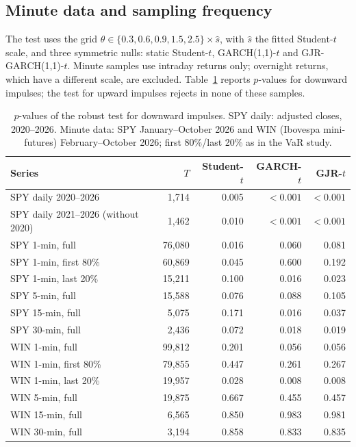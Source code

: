 \documentclass[11pt,a4paper]{article}
\theoremstyle{definition}
\theoremstyle{remark}
\begin{document}
\subsection{Minute data and sampling frequency}\label{sec:minute}
The test uses the grid $\theta\in\{0.3,0.6,0.9,1.5,2.5\}\times\hat s$, with $\hat s$ the fitted Student-$t$ scale, and three symmetric nulls: static Student-$t$, GARCH(1,1)-$t$ and GJR-GARCH(1,1)-$t$. Minute samples use intraday returns only; overnight returns, which have a different scale, are excluded. Table~\ref{tab:data} reports $p$-values for downward impulses; the test for upward impulses rejects in none of these samples.

\begin{table}[ht]\centering\footnotesize\setlength{\tabcolsep}{4pt}
\caption{$p$-values of the robust test for downward impulses. SPY daily: adjusted closes, 2020--2026. Minute data: SPY January--October 2026 and WIN (Ibovespa mini-futures) February--October 2026; first 80\%/last 20\% as in the VaR study.}\label{tab:data}
\begin{tabular}{lrrrr}
\toprule
Series & $T$ & Student-$t$ & GARCH-$t$ & GJR-$t$\\
\midrule
SPY daily 2020--2026 & 1{,}714 & 0.005 & $<0.001$ & $<0.001$\\
SPY daily 2021--2026 (without 2020) & 1{,}462 & 0.010 & $<0.001$ & $<0.001$\\
\addlinespace
SPY 1-min, full & 76{,}080 & 0.016 & 0.060 & 0.081\\
SPY 1-min, first 80\% & 60{,}869 & 0.045 & 0.600 & 0.192\\
SPY 1-min, last 20\% & 15{,}211 & 0.100 & 0.016 & 0.023\\
SPY 5-min, full & 15{,}588 & 0.076 & 0.088 & 0.105\\
SPY 15-min, full & 5{,}075 & 0.171 & 0.016 & 0.037\\
SPY 30-min, full & 2{,}436 & 0.072 & 0.018 & 0.019\\
\addlinespace
WIN 1-min, full & 99{,}812 & 0.201 & 0.056 & 0.056\\
WIN 1-min, first 80\% & 79{,}855 & 0.447 & 0.261 & 0.267\\
WIN 1-min, last 20\% & 19{,}957 & 0.028 & 0.008 & 0.008\\
WIN 5-min, full & 19{,}875 & 0.667 & 0.455 & 0.457\\
WIN 15-min, full & 6{,}565 & 0.850 & 0.983 & 0.981\\
WIN 30-min, full & 3{,}194 & 0.858 & 0.833 & 0.835\\
\bottomrule
\end{tabular}
\end{table}
\end{document}
